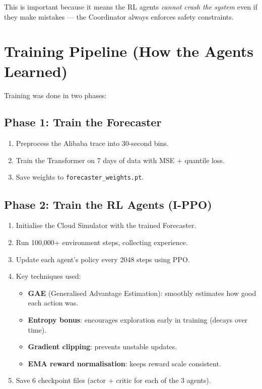 \documentclass[11pt,a4paper]{article}
\begin{document}
This is important because it means the RL agents \textit{cannot crash the system}
even if they make mistakes --- the Coordinator always enforces safety constraints.


\section{Training Pipeline (How the Agents Learned)}


Training was done in two phases:

\subsection{Phase 1: Train the Forecaster}
\begin{enumerate}[leftmargin=2em]
  \item Preprocess the Alibaba trace into 30-second bins.
  \item Train the Transformer on 7 days of data with MSE + quantile loss.
  \item Save weights to \texttt{forecaster\_weights.pt}.
\end{enumerate}

\subsection{Phase 2: Train the RL Agents (I-PPO)}
\begin{enumerate}[leftmargin=2em]
  \item Initialise the Cloud Simulator with the trained Forecaster.
  \item Run 100{,}000+ environment steps, collecting experience.
  \item Update each agent's policy every 2048 steps using PPO.
  \item Key techniques used:
    \begin{itemize}
      \item \textbf{GAE} (Generalised Advantage Estimation): smoothly estimates
            how good each action was.
      \item \textbf{Entropy bonus}: encourages exploration early in training
            (decays over time).
      \item \textbf{Gradient clipping}: prevents unstable updates.
      \item \textbf{EMA reward normalisation}: keeps reward scale consistent.
    \end{itemize}
  \item Save 6 checkpoint files (actor + critic for each of the 3 agents).
\end{enumerate}
\end{document}
